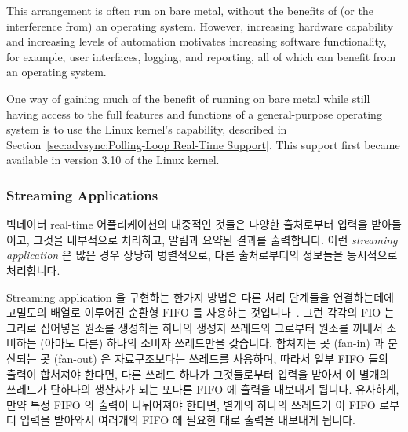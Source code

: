 This arrangement is often run on bare metal, without the benefits of
(or the interference from) an operating system.
However, increasing hardware capability and increasing levels of
automation motivates increasing software functionality, for example,
user interfaces, logging, and reporting, all of which can benefit from
an operating system.

One way of gaining much of the benefit of running on bare metal while
still having access to the full features and functions of a
general-purpose operating system is to use the Linux kernel's
 capability, described in
Section~\ref{sec:advsync:Polling-Loop Real-Time Support}.
This support first became available in version 3.10 of the Linux kernel.
\fi

\subsubsection{Streaming Applications}
\label{sec:advsync:Streaming Applications}

빅데이터 real-time 어플리케이션의 대중적인 것들은 다양한 출처로부터 입력을
받아들이고, 그것을 내부적으로 처리하고, 알림과 요약된 결과를 출력합니다.
이런 \emph{streaming application} 은 많은 경우 상당히 병렬적으로, 다른
출처로부터의 정보들을 동시적으로 처리합니다.

Streaming application 을 구현하는 한가지 방법은 다른 처리 단계들을 연결하는데에
고밀도의 배열로 이루어진 순환형 FIFO 를 사용하는
것입니다~\cite{AdrianSutton2013LCA:Disruptor}.
그런 각각의 FIO 는 그리로 집어넣을 원소를 생성하는 하나의 생성자 쓰레드와
그로부터 원소를 꺼내서 소비하는 (아마도 다른) 하나의 소비자 쓰레드만을
갖습니다.
합쳐지는 곳 (fan-in) 과 분산되는 곳 (fan-out) 은 자료구조보다는 쓰레드를
사용하며, 따라서 일부 FIFO 들의 출력이 합쳐져야 한다면, 다른 쓰레드 하나가
그것들로부터 입력을 받아서 이 별개의 쓰레드가 단하나의 생산자가 되는 또다른
FIFO 에 출력을 내보내게 됩니다.
유사하게, 만약 특정 FIFO 의 출력이 나뉘어져야 한다면, 별개의 하나의 쓰레드가 이
FIFO 로부터 입력을 받아와서 여러개의 FIFO 에 필요한 대로 출력을 내보내게
됩니다.

